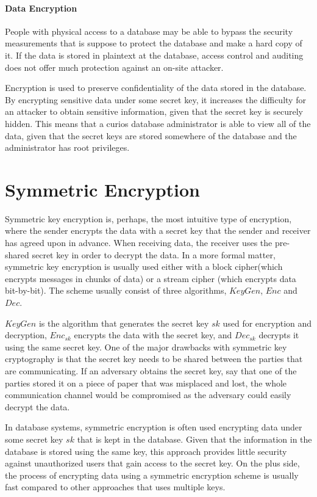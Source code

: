 \paragraph{Data Encryption}

People with physical access to a database may be able to bypass the security measurements that is suppose to protect the database and make a hard copy of it. If the data is stored in plaintext at the database, access control and auditing does not offer much protection against an on-site attacker. 

Encryption is used to preserve confidentiality of the data stored in the database. By encrypting sensitive data under some secret key, it increases the difficulty for an attacker to obtain sensitive information, given that the secret key is securely hidden. This means that a curios database administrator is able to view all of the data, given that the secret keys are stored somewhere of the database and the administrator has root privileges. 

\section{Symmetric Encryption}

Symmetric key encryption is, perhaps, the most intuitive type of encryption, where the sender encrypts the data with a secret key that the sender and receiver has agreed upon in advance. When receiving data, the receiver uses the pre-shared secret key in order to decrypt the data. In a more formal matter, symmetric key encryption is usually used either with a block cipher(which encrypts messages in chunks of data) or a stream cipher (which encrypts data bit-by-bit). The scheme usually consist of three algorithms, $KeyGen$, $Enc$ and $Dec$.

$KeyGen$ is the algorithm that generates the secret key $sk$ used for encryption and decryption, $Enc_{sk}$ encrypts the data with the secret key, and $Dec_{sk}$ decrypts it using the same secret key. One of the major drawbacks with symmetric key cryptography is that the secret key needs to be shared between the parties that are communicating. If an adversary obtains the secret key, say that one of the parties stored it on a piece of paper that was misplaced and lost, the whole communication channel would be compromised as the adversary could easily decrypt the data.

In database systems, symmetric encryption is often used encrypting data under some secret key $sk$ that is kept in the database. Given that the information in the database is stored using the same key, this approach provides little security against unauthorized users that gain access to the secret key. On the plus side, the process of encrypting data using a symmetric encryption scheme is usually fast compared to other approaches that uses multiple keys.


